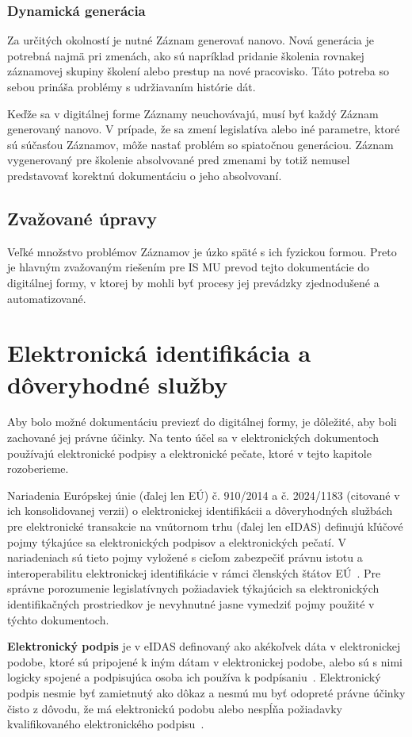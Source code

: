 \documentclass[
  digital,     %
  oneside,     %
  nosansbold,  %
  nocolorbold, %
  lof,         %
  nolot,         %
]{fithesis4}
\begin{document}
\subsection*{Dynamická generácia}
Za určitých okolností je nutné Záznam generovať nanovo. Nová generácia je potrebná najmä pri zmenách, ako sú napríklad pridanie školenia rovnakej záznamovej skupiny školení alebo prestup na nové pracovisko. Táto potreba so sebou prináša problémy s udržiavaním histórie dát.

Keďže sa v digitálnej forme Záznamy neuchovávajú, musí byť každý Záznam generovaný nanovo. V prípade, že sa zmení legislatíva alebo iné parametre, ktoré sú súčasťou Záznamov, môže nastať problém so spiatočnou generáciou. Záznam vygenerovaný pre školenie absolvované pred zmenami by totiž nemusel predstavovať korektnú dokumentáciu o jeho absolvovaní.

\section{Zvažované úpravy}
Veľké množstvo problémov Záznamov je úzko späté s ich fyzickou formou. Preto je hlavným zvažovaným riešením pre IS MU prevod tejto dokumentácie do digitálnej formy, v ktorej by mohli byť procesy jej prevádzky zjednodušené a automatizované.


\chapter{Elektronická identifikácia a dôveryhodné služby}
\label{kap-4}
Aby bolo možné dokumentáciu previezť do digitálnej formy, je dôležité, aby boli zachované jej právne účinky. Na tento účel sa v elektronických dokumentoch používajú elektronické podpisy a elektronické pečate, ktoré v tejto kapitole rozoberieme.

Nariadenia Európskej únie (ďalej len EÚ) č. 910/2014 a č. 2024/1183 (citované v ich konsolidovanej verzii) o elektronickej identifikácii a dôveryhodných službách pre elektronické transakcie na vnútornom trhu (ďalej len eIDAS) definujú kľúčové pojmy týkajúce sa elektronických podpisov a elektronických pečatí. V nariadeniach sú tieto pojmy vyložené s cieľom zabezpečiť právnu istotu a interoperabilitu elektronickej identifikácie v rámci členských štátov EÚ~\cite{eidas2024}. Pre správne porozumenie legislatívnych požiadaviek týkajúcich sa elektronických identifikačných prostriedkov je nevyhnutné jasne vymedziť pojmy použité v týchto dokumentoch.

\textbf{Elektronický podpis} je v eIDAS definovaný ako akékoľvek dáta v elektronickej podobe, ktoré sú pripojené k iným dátam v elektronickej podobe, alebo sú s nimi logicky spojené a podpisujúca osoba ich používa k podpísaniu~\cite[čl.~3,~odst.~10]{eidas2024}. Elektronický podpis nesmie byť zamietnutý ako dôkaz a nesmú mu byť odopreté právne účinky čisto z dôvodu, že má elektronickú podobu alebo nespĺňa požiadavky kvalifikovaného elektronického podpisu~\cite[čl.~25,~odst.~1]{eidas2024}.
\end{document}
